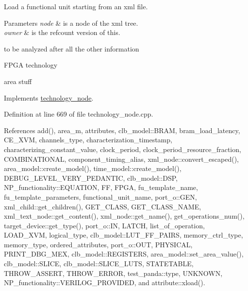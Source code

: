 Load a functional unit starting from an xml file. 


\begin{DoxyParams}{Parameters}
{\em node} & is a node of the xml tree. \\
\hline
{\em owner} & is the refcount version of this. \\
\hline
\end{DoxyParams}
to be analyzed after all the other information

F\+P\+GA technology

area stuff 

Implements \hyperlink{structtechnology__node_aab3accd94480958219ca7771dd981a4f}{technology\+\_\+node}.



Definition at line 669 of file technology\+\_\+node.\+cpp.



References add(), area\+\_\+m, attributes, clb\+\_\+model\+::\+B\+R\+AM, bram\+\_\+load\+\_\+latency, C\+E\+\_\+\+X\+VM, channels\+\_\+type, characterization\+\_\+timestamp, characterizing\+\_\+constant\+\_\+value, clock\+\_\+period, clock\+\_\+period\+\_\+resource\+\_\+fraction, C\+O\+M\+B\+I\+N\+A\+T\+I\+O\+N\+AL, component\+\_\+timing\+\_\+alias, xml\+\_\+node\+::convert\+\_\+escaped(), area\+\_\+model\+::create\+\_\+model(), time\+\_\+model\+::create\+\_\+model(), D\+E\+B\+U\+G\+\_\+\+L\+E\+V\+E\+L\+\_\+\+V\+E\+R\+Y\+\_\+\+P\+E\+D\+A\+N\+T\+IC, clb\+\_\+model\+::\+D\+SP, N\+P\+\_\+functionality\+::\+E\+Q\+U\+A\+T\+I\+ON, FF, F\+P\+GA, fu\+\_\+template\+\_\+name, fu\+\_\+template\+\_\+parameters, functional\+\_\+unit\+\_\+name, port\+\_\+o\+::\+G\+EN, xml\+\_\+child\+::get\+\_\+children(), G\+E\+T\+\_\+\+C\+L\+A\+SS, G\+E\+T\+\_\+\+C\+L\+A\+S\+S\+\_\+\+N\+A\+ME, xml\+\_\+text\+\_\+node\+::get\+\_\+content(), xml\+\_\+node\+::get\+\_\+name(), get\+\_\+operations\+\_\+num(), target\+\_\+device\+::get\+\_\+type(), port\+\_\+o\+::\+IN, L\+A\+T\+CH, list\+\_\+of\+\_\+operation, L\+O\+A\+D\+\_\+\+X\+VM, logical\+\_\+type, clb\+\_\+model\+::\+L\+U\+T\+\_\+\+F\+F\+\_\+\+P\+A\+I\+RS, memory\+\_\+ctrl\+\_\+type, memory\+\_\+type, ordered\+\_\+attributes, port\+\_\+o\+::\+O\+UT, P\+H\+Y\+S\+I\+C\+AL, P\+R\+I\+N\+T\+\_\+\+D\+B\+G\+\_\+\+M\+EX, clb\+\_\+model\+::\+R\+E\+G\+I\+S\+T\+E\+RS, area\+\_\+model\+::set\+\_\+area\+\_\+value(), clb\+\_\+model\+::\+S\+L\+I\+CE, clb\+\_\+model\+::\+S\+L\+I\+C\+E\+\_\+\+L\+U\+TS, S\+T\+A\+T\+E\+T\+A\+B\+LE, T\+H\+R\+O\+W\+\_\+\+A\+S\+S\+E\+RT, T\+H\+R\+O\+W\+\_\+\+E\+R\+R\+OR, test\+\_\+panda\+::type, U\+N\+K\+N\+O\+WN, N\+P\+\_\+functionality\+::\+V\+E\+R\+I\+L\+O\+G\+\_\+\+P\+R\+O\+V\+I\+D\+ED, and attribute\+::xload().

